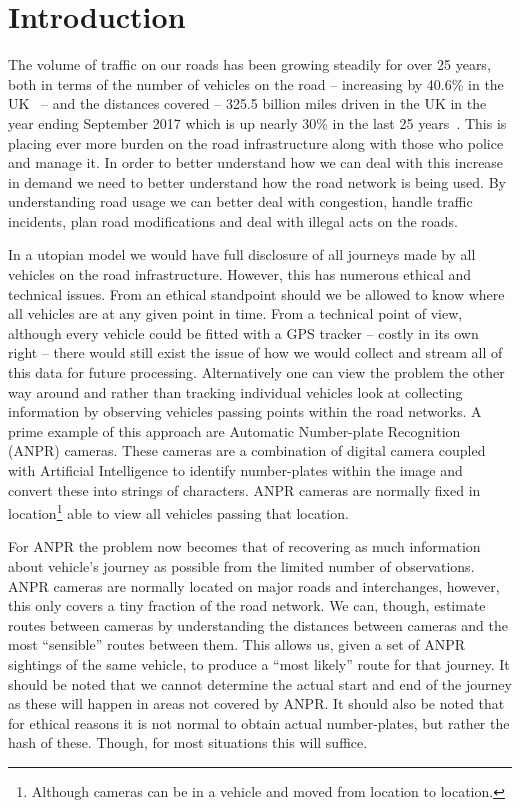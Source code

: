 \section{Introduction}

The volume of traffic on our roads has been growing steadily for over 25 years, both in terms of the number of vehicles on the road -- increasing by 40.6\% in the UK~\cite{noVehiocles} -- and the distances covered -- 325.5 billion miles driven in the UK in the year ending September 2017 which is up nearly 30\% in the last 25 years~\cite{distance}. This is placing ever more burden on the road infrastructure along with those who police and manage it. In order to better understand how we can deal with this increase in demand we need to better understand how the road network is being used. By understanding road usage we can better deal with congestion, handle traffic incidents, plan road modifications and deal with illegal acts on the roads. 

In a utopian model we would have full disclosure of all journeys made by all vehicles on the road infrastructure. However, this has numerous ethical and technical issues. From an ethical standpoint should we be allowed to know where all vehicles are at any given point in time. From a technical point of view, although every vehicle could be fitted with a GPS tracker -- costly in its own right -- there would still exist the issue of how we would collect and stream all of this data for future processing. Alternatively one can view the problem the other way around and rather than tracking individual vehicles look at collecting information by observing vehicles passing points within the road networks. A prime example of this approach are Automatic Number-plate Recognition (ANPR) cameras. These cameras are a combination of digital camera coupled with Artificial Intelligence to identify number-plates within the image and convert these into strings of characters. ANPR cameras are normally fixed in location\footnote{Although cameras can be in a vehicle and moved from location to location.} able to view all vehicles passing that location.

For ANPR the problem now becomes that of recovering as much information about vehicle's journey as possible from the limited number of observations. ANPR cameras are normally located on major roads and interchanges, however, this only covers a tiny fraction of the road network. We can, though, estimate routes between cameras by understanding the distances between cameras and the most ``sensible'' routes between them. This allows us, given a set of ANPR sightings of the same vehicle, to produce a ``most likely'' route for that journey. It should be noted that we cannot determine the actual start and end of the journey as these will happen in areas not covered by ANPR. It should also be noted that for ethical reasons it is not normal to obtain actual number-plates, but rather the hash of these. Though, for most situations this will suffice.

